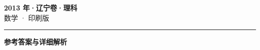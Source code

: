 \documentclass[zihao=5, a4paper]{ctexart}
\begin{document}
\begin{center}
  {\Large\bfseries 2013 年·辽宁卷·理科}\\[4pt]
  {\large 数学 · 印刷版}
\end{center}
\medskip
{}

\par\bigskip\hrule\bigskip
{}
\Needspace{0.55\textheight}
\begin{center}{\large\bfseries 参考答案与详细解析}\end{center}
\smallskip

\end{document}
